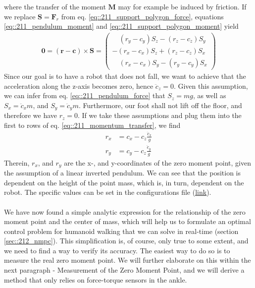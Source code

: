 where the transfer of the moment $\bm{M}$ may for example be induced by friction. If we replace $\bm{S}=\bm{F}_r$ from eq. \ref{eq::211_support_polygon_force}, equations \ref{eq::211_pendulum_moment} and \ref{eq::211_support_polygon_moment} yield 
\begin{align}
	\bm{0} = (\bm{r}-\bm{c})\times\bm{S} = \begin{pmatrix}
	\quad(r_y - c_y)S_z - (r_z - c_z)S_y \\
	-(r_x - c_x)S_z + (r_z - c_z)S_x \\
	\quad(r_x - c_x)S_y - (r_y - c_y)S_x
	\end{pmatrix}
	\label{eq::211_momentum_transfer}
\end{align}
Since our goal is to have a robot that does not fall, we want to achieve that the acceleration along the z-axis becomes zero, hence $\ddot{c}_z=0$. Given this assumption, we can infer from eq. \ref{eq::211_pendulum_force} that $S_z=mg$, as well as $S_x = \ddot{c}_xm$, and $S_y = \ddot{c}_ym$. Furthermore, our foot shall not lift off the floor, and therefore we have $r_z=0$. If we take these assumptions and plug them into the first to rows of eq. \ref{eq::211_momentum_transfer}, we find
\begin{align}
	r_x &= c_x - c_z\frac{\ddot{c}_x}{g}
	\label{eq::211_zmp_x}\\
	r_y &= c_y - c_z\frac{\ddot{c}_y}{g}
	\label{eq::211_zmp_y}
\end{align}
Therein, $r_x$, and $r_y$ are the x-, and y-coordinates of the zero moment point, given the assumption of a linear inverted pendulum. We can see that the position is dependent on the height of the point mass, which is, in turn, dependent on the robot. The specific values can be set in the configurations file (\href{https://github.com/mhubii/nmpc_pattern_generator/blob/bc79a6d4f9bcfd3794146355af44429f5b7a9fe0/libs/pattern_generator/configs.yaml#L27}{\underline{link}}).
\\\\
We have now found a simple analytic expression for the relationship of the zero moment point and the center of mass, which will help us to formulate an optimal control problem for humanoid walking that we can solve in real-time (section \ref{sec::212_nmpc}). This simplification is, of course, only true to some extent, and we need to find a way to verify its accuracy. The easiest way to do so is to measure the real zero moment point. We will further elaborate on this within the next paragraph - Measurement of the Zero Moment Point, and we will derive a method that only relies on force-torque sensors in the ankle.
\FloatBarrier
